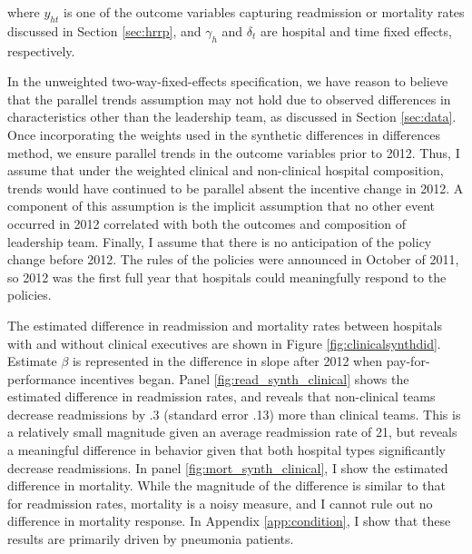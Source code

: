 \documentclass[12pt]{article}
\begin{document}
    \noindent where $y_{ht}$ is one of the outcome variables capturing readmission or mortality rates discussed in Section \ref{sec:hrrp}, and $\gamma_h$ and $\delta_t$ are hospital and time fixed effects, respectively. 

    In the unweighted two-way-fixed-effects specification, we have reason to believe that the parallel trends assumption may not hold due to observed differences in characteristics other than the leadership team, as discussed in Section \ref{sec:data}. Once incorporating the weights used in the synthetic differences in differences method, we ensure parallel trends in the outcome variables prior to 2012. Thus, I assume that under the weighted clinical and non-clinical hospital composition, trends would have continued to be parallel absent the incentive change in 2012. A component of this assumption is the implicit assumption that no other event occurred in 2012 correlated with both the outcomes and composition of leadership team. Finally, I assume that there is no anticipation of the policy change before 2012. The rules of the policies were announced in October of 2011, so 2012 was the first full year that hospitals could meaningfully respond to the policies.

    The estimated difference in readmission and mortality rates between hospitals with and without clinical executives are shown in Figure \ref{fig:clinicalsynthdid}. Estimate $\beta$ is represented in the difference in slope after 2012 when pay-for-performance incentives began. Panel \ref{fig:read_synth_clinical} shows the estimated difference in readmission rates, and reveals that non-clinical teams decrease readmissions by .3 (standard error .13) more than clinical teams. This is a relatively small magnitude given an average readmission rate of 21, but reveals a meaningful difference in behavior given that both hospital types significantly decrease readmissions. In panel \ref{fig:mort_synth_clinical}, I show the estimated difference in mortality. While the magnitude of the difference is similar to that for readmission rates, mortality is a noisy measure, and I cannot rule out no difference in mortality response. In Appendix \ref{app:condition}, I show that these results are primarily driven by pneumonia patients.  
\end{document}
